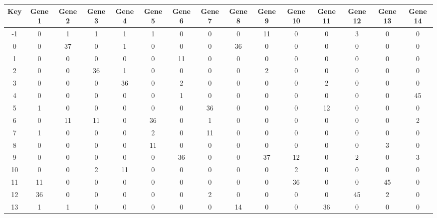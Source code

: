 \begin{tabular}{|c|c|c|c|c|c|c|c|c|c|c|c|c|c|c|}
\hline
Key & Gene 1 & Gene 2 & Gene 3 & Gene 4 & Gene 5 & Gene 6 & Gene 7 & Gene 8 & Gene 9 & Gene 10 & Gene 11 & Gene 12 & Gene 13 & Gene 14 \\
\hline
-1 & 0 & 1 & 1 & 1 & 1 & 0 & 0 & 0 & 11 & 0 & 0 & 3 & 0 & 0 \\
0 & 0 & 37 & 0 & 1 & 0 & 0 & 0 & 36 & 0 & 0 & 0 & 0 & 0 & 0 \\
1 & 0 & 0 & 0 & 0 & 0 & 11 & 0 & 0 & 0 & 0 & 0 & 0 & 0 & 0 \\
2 & 0 & 0 & 36 & 1 & 0 & 0 & 0 & 0 & 2 & 0 & 0 & 0 & 0 & 0 \\
3 & 0 & 0 & 0 & 36 & 0 & 2 & 0 & 0 & 0 & 0 & 2 & 0 & 0 & 0 \\
4 & 0 & 0 & 0 & 0 & 0 & 1 & 0 & 0 & 0 & 0 & 0 & 0 & 0 & 45 \\
5 & 1 & 0 & 0 & 0 & 0 & 0 & 36 & 0 & 0 & 0 & 12 & 0 & 0 & 0 \\
6 & 0 & 11 & 11 & 0 & 36 & 0 & 1 & 0 & 0 & 0 & 0 & 0 & 0 & 2 \\
7 & 1 & 0 & 0 & 0 & 2 & 0 & 11 & 0 & 0 & 0 & 0 & 0 & 0 & 0 \\
8 & 0 & 0 & 0 & 0 & 11 & 0 & 0 & 0 & 0 & 0 & 0 & 0 & 3 & 0 \\
9 & 0 & 0 & 0 & 0 & 0 & 36 & 0 & 0 & 37 & 12 & 0 & 2 & 0 & 3 \\
10 & 0 & 0 & 2 & 11 & 0 & 0 & 0 & 0 & 0 & 2 & 0 & 0 & 0 & 0 \\
11 & 11 & 0 & 0 & 0 & 0 & 0 & 0 & 0 & 0 & 36 & 0 & 0 & 45 & 0 \\
12 & 36 & 0 & 0 & 0 & 0 & 0 & 2 & 0 & 0 & 0 & 0 & 45 & 2 & 0 \\
13 & 1 & 1 & 0 & 0 & 0 & 0 & 0 & 14 & 0 & 0 & 36 & 0 & 0 & 0 \\
\hline
\end{tabular}